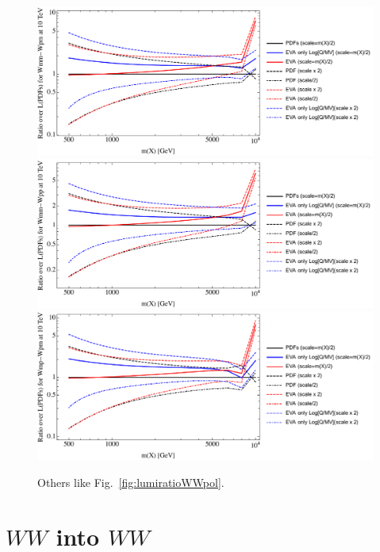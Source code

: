 \documentclass[a4paper,11pt]{article}
\begin{document}
\begin{figure}[!t]
\includegraphics[width=0.46\linewidth]{Notebooks/PlotLumi/10TeV/ratios/Wmm-Wpm.pdf}
\includegraphics[width=0.46\linewidth]{Notebooks/PlotLumi/10TeV/ratios/Wmm-Wpp.pdf}
\includegraphics[width=0.46\linewidth]{Notebooks/PlotLumi/10TeV/ratios/Wmp-Wpm.pdf}
\caption{Others like Fig.~\ref{fig:lumiratioWWpol}. \label{fig:lumiratioWWpol2}}
\end{figure}


%
%


\clearpage

\section{$WW$ into $WW$}
\end{document}
